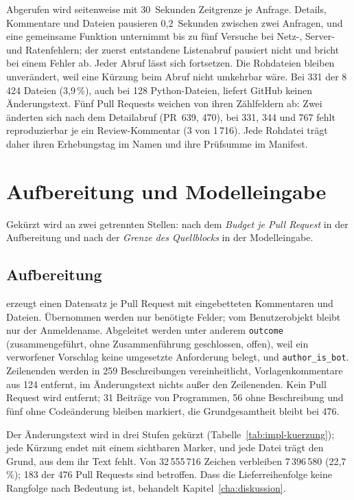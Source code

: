 \documentclass[11pt,a4paper]{report}
\begin{document}
Abgerufen wird seitenweise mit 30~Sekunden Zeitgrenze je Anfrage.
Details, Kommentare und Dateien pausieren 0,2~Sekunden zwischen zwei
Anfragen, und eine gemeinsame Funktion unternimmt bis zu fünf Versuche
bei Netz-, Server- und Ratenfehlern; der zuerst entstandene Listenabruf
pausiert nicht und bricht bei einem Fehler ab. Jeder Abruf lässt sich
fortsetzen.
Die Rohdateien bleiben unverändert, weil eine Kürzung beim Abruf nicht
umkehrbar wäre. Bei 331 der 8\,424 Dateien (3,9\,\%), auch bei 128
Python-Dateien, liefert GitHub keinen Änderungstext. Fünf Pull Requests
weichen von ihren Zählfeldern ab: Zwei änderten sich nach dem
Detailabruf (PR~639, 470), bei 331, 344 und 767 fehlt reproduzierbar je
ein Review-Kommentar (3 von 1\,716). Jede Rohdatei trägt daher ihren
Erhebungstag im Namen und ihre Prüfsumme im Manifest.

\section{Aufbereitung und Modelleingabe}
\label{sec:impl-aufbereitung}

Gekürzt wird an zwei getrennten Stellen: nach dem \emph{Budget je Pull
Request} in der Aufbereitung und nach der \emph{Grenze des Quellblocks}
in der Modelleingabe.

\subsection{Aufbereitung}
\label{subsec:impl-interim}

 erzeugt einen Datensatz je Pull
Request mit eingebetteten Kommentaren und Dateien. Übernommen werden nur
benötigte Felder; vom Benutzerobjekt bleibt nur der Anmeldename.
Abgeleitet werden unter anderem \texttt{outcome} (zusammengeführt,
ohne Zusammenführung geschlossen, offen), weil ein verworfener Vorschlag
keine umgesetzte Anforderung belegt, und \texttt{author\_is\_bot}.
Zeilenenden werden in 259 Beschreibungen vereinheitlicht,
Vorlagenkommentare aus 124 entfernt, im Änderungstext nichts außer den
Zeilenenden. Kein Pull Request wird entfernt; 31 Beiträge von
Programmen, 56 ohne Beschreibung und fünf ohne Codeänderung bleiben
markiert, die Grundgesamtheit bleibt bei 476.

Der Änderungstext wird in drei Stufen gekürzt
(Tabelle~\ref{tab:impl-kuerzung}); jede Kürzung endet mit einem
sichtbaren Marker, und jede Datei trägt den Grund, aus dem ihr Text
fehlt. Von 32\,555\,716 Zeichen verbleiben 7\,396\,580 (22,7\,\%); 183
der 476 Pull Requests sind betroffen. Dass die Lieferreihenfolge keine
Rangfolge nach Bedeutung ist, behandelt Kapitel~\ref{cha:diskussion}.
\end{document}
